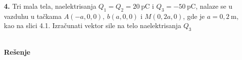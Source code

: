 \textbf{\Large 4.} Tri mala tela, naelektrisanja $Q_1=Q_2 = 20\ \mathrm{pC}$ i $Q_3 = -50\ \mathrm{pC}$, nalaze se u vazduhu u ta\v{c}kama $A(-a, 0, 0),\ b(a, 0, 0)$ i $M(0,2a, 0)$, gde je  $a = 0,2\ \mathrm m$, kao na slici 4.1. Izra\v{c}unati vektor sile na telo naelektrisanja $Q_3$

\\
\textbf{\Large Re\v{s}enje}
